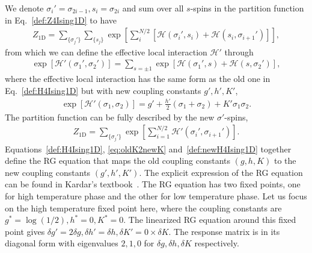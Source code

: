 \documentclass[aps,prb,reprint,superscriptaddress]{revtex4-2}
\begin{document}
We denote $\sigma_i'=\sigma_{2i-1}, s_i = \sigma_{2i}$ and sum over all
$s$-spins in the partition function in Eq.~\eqref{def:Z4Ising1D} to have
%
\begin{align}\label{eq:oldK2newKZ}
    Z_{\text{1D}} = \sum_{\{\sigma_j'\}} \sum_{\{s_j \}}
    \exp{\left[ \sum_i^{N/2} \left[\mathscr{H}\left(\sigma_i',s_i\right)
    + \mathscr{H}\left(s_i,\sigma_{i+1}'\right)\right]\right]},
\end{align}
%
from which we can define the effective local interaction $\mathscr{H}'$
through
%
\begin{align}\label{eq:oldK2newK}
    \exp{\left[\mathscr{H}'\left(\sigma_1',\sigma_2'\right)\right]} =
    \sum_{s=\pm 1}\exp{\left[\mathscr{H}\left(\sigma_1',s\right) +
        \mathscr{H}\left(s,\sigma_2'\right)\right]},
\end{align}
%
where the effective local interaction has the same form as the old one
in Eq.~\eqref{def:H4Ising1D} but with new coupling constants $g',h',K'$,
%
\begin{align}\label{def:newH4Ising1D}
    \exp{\left[\mathscr{H}'\left(\sigma_1,\sigma_2\right)\right]} = g' +
    \frac{h'}{2}\left(\sigma_1 + \sigma_2\right) + K' \sigma_1 \sigma_2.
\end{align}
%
The partition function can be fully described by the new $\sigma'$-spins,
%
\begin{align}\label{eq:Z2Ising1Dnew}
    Z_{\text{1D}} = \sum_{\{\sigma_j'\}}
    \exp{\left[\sum_{i=1}^{N/2}\mathscr{H}'\left(\sigma_i',\sigma_{i+1}'\right)\right]}.
\end{align}
%
Equations~\eqref{def:H4Ising1D}, \eqref{eq:oldK2newK}
and~\eqref{def:newH4Ising1D} together define the RG equation that maps
the old coupling constants $(g,h,K)$ to the new coupling constants
$(g',h',K')$. The explicit expression of the RG equation can be found in
Kardar's textbook~\cite{kardar2007}. The RG equation has two fixed
points, one for high temperature phase and the other for low temperature
phase. Let us focus on the high temperature fixed point here, where the
coupling constants are $g^* = \log\left(1/2\right),h^*=0,K^*=0$. The
linearized RG equation around this fixed point gives $\delta g' =
2\delta g, \delta h' = \delta h, \delta K' = 0\times \delta K$. The
response matrix is in its diagonal form with eigenvalues $2,1,0$ for
$\delta g,\delta h,\delta K$ respectively.
%
\end{document}
